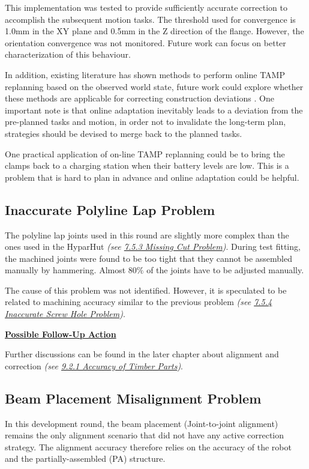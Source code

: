 This implementation was tested to provide sufficiently accurate correction to accomplish the subsequent motion tasks. The threshold used for convergence is 1.0mm in the XY plane and 0.5mm in the Z direction of the flange. However, the orientation convergence was not monitored. Future work can focus on better characterization of this behaviour. 

In addition, existing literature has shown methods to perform online TAMP replanning based on the observed world state, future work could explore whether these methods are applicable for correcting construction deviations \parencite{elbanhawiSamplingBasedRobotMotion2014, otteMathrmRRTRealTime2015}. One important note is that online adaptation inevitably leads to a deviation from the pre-planned tasks and motion, in order not to invalidate the long-term plan, strategies should be devised to merge back to the planned tasks.

One practical application of on-line TAMP replanning could be to bring the clamps back to a charging station when their battery levels are low. This is a problem that is hard to plan in advance and online adaptation could be helpful. 

\subsection{Inaccurate Polyline Lap Problem}

The polyline lap joints used in this round are slightly more complex than the ones used in the HyparHut \textit{(see \ul{7.5.3 Missing Cut Problem})}. During test fitting, the machined joints were found to be too tight that they cannot be assembled manually by hammering. Almost 80$\%$ of the joints have to be adjusted manually. 

The cause of this problem was not identified. However, it is speculated to be related to machining accuracy similar to the previous problem \textit{(see \ul{7.5.4 Inaccurate Screw Hole Problem})}.

\textbf{\ul{Possible Follow-Up Action}}

Further discussions can be found in the later chapter about alignment and correction \textit{(see \ul{9.2.1 Accuracy of Timber Parts})}.

\subsection{Beam Placement Misalignment Problem}

In this development round, the beam placement (Joint-to-joint alignment) remains the only alignment scenario that did not have any active correction strategy. The alignment accuracy therefore relies on the accuracy of the robot and the partially-assembled (PA) structure. 

